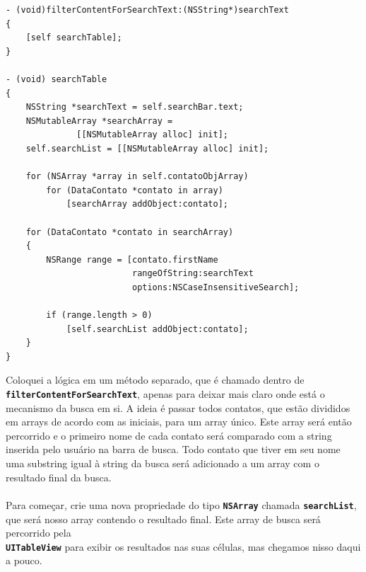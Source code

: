 \documentclass[a4paper,12pt,brazil,doubleside]{book}
\begin{document}
\begin{listing}
\begin{verbatim}
- (void)filterContentForSearchText:(NSString*)searchText
{
    [self searchTable];
}

- (void) searchTable
{
    NSString *searchText = self.searchBar.text;
    NSMutableArray *searchArray =
              [[NSMutableArray alloc] init];
    self.searchList = [[NSMutableArray alloc] init];
    
    for (NSArray *array in self.contatoObjArray)
        for (DataContato *contato in array)
            [searchArray addObject:contato];
    
    for (DataContato *contato in searchArray)
    {
        NSRange range = [contato.firstName
                         rangeOfString:searchText
                         options:NSCaseInsensitiveSearch];
        
        if (range.length > 0)
            [self.searchList addObject:contato];
    }
}
\end{verbatim}
\end{listing}

Coloquei a lógica em um método separado, que é chamado dentro de\\
\texttt{\textbf{filterContentForSearchText}}, apenas para deixar mais claro onde está o mecanismo da busca em si. A ideia é passar todos contatos, que estão divididos em arrays de acordo com as iniciais, para um array único. Este array será então percorrido e o primeiro nome de cada contato será comparado com a string inserida pelo usuário na barra de busca. Todo contato que tiver em seu nome uma substring igual à string da busca será adicionado a um array com o resultado final da busca.
\paragraph{}Para começar, crie uma nova propriedade do tipo \texttt{\textbf{NSArray}} chamada \texttt{\textbf{searchList}}, que será nosso array contendo o resultado final. Este array de busca será percorrido pela\\
\texttt{\textbf{UITableView}} para exibir os resultados nas suas células, mas chegamos nisso daqui a pouco.
\end{document}
